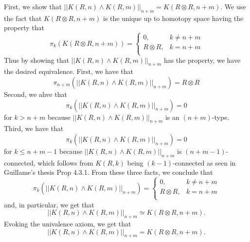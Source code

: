 \documentclass[12pt]{amsart}
\theoremstyle{remark}
\theoremstyle{definition}
\begin{document}
First, we show that
$ || K(R,n) \wedge K(R,m) ||_{n+m} = K( R \otimes R, n+m )
$. We use the fact that $K (R \otimes R, n+m )$ is the unique up to homotopy space
having the property that
\[
  \pi_k (K(R \otimes R, n+m )) =
  \begin{cases}
    0, & k \neq n+m \\
    R \otimes R, & k= n+m \\
  \end{cases}
\]
Thus by showing that $ || K(R,n) \wedge K(R,m) ||_{n+m} $
has the property, we have the desired
equivalence. First, we have that
\[
  \pi_{n+m} ( || K(R,n) \wedge K(R,m) ||_{n+m} )
  = R \otimes R
\]
Second, we ahve that
\[
  \pi_k ( || K(R,n) \wedge K(R,m) ||_{n+m} )
  = 0
\]
for $ k > n+m $ because $ || K(R,n) \wedge K(R,m) ||_{n+m} $
is an $ ( n+m ) $-type. Third, we have that 
\[
  \pi_k (|| K(R,n) \wedge K(R,m) ||_{n+m} ) = 0
\]
for $ k \leq n+m-1 $ because
$ || K(R,n) \wedge K(R,m) ||_{n+m} $ is
$ ( n+m-1 ) $-connected, which follows from $ K( R,k ) $ being
$ ( k-1 ) $-connected as seen in Guillame's
thesis Prop 4.3.1. From these three facts, we conclude that
\[
  \pi_k (|| K(R,n) \wedge K(R,m) ||_{n+m}) =
  \begin{cases}
    0, & k \neq n+m \\
    R \otimes R, & k= n+m \\
  \end{cases}
\]
and, in particular, we get that
\[
  || K(R,n) \wedge K(R,m) ||_{n+m} \simeq
  K (R \otimes R, n+m ).
\]
Evoking the univalence axiom, we get that
\[
  || K(R,n) \wedge K(R,m) ||_{n+m} =
  K (R \otimes R, n+m ).
\]
\end{document}
